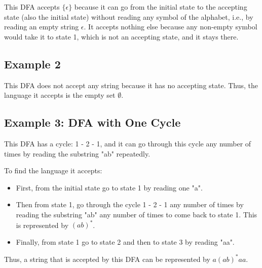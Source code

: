 \documentclass[12pt]{article}
\begin{document}
This DFA accepts \(\{\epsilon\}\) because it can go from the initial state to the accepting state (also the initial state) without reading any symbol of the alphabet, i.e., by reading an empty string \( \epsilon \). It accepts nothing else because any non-empty symbol would take it to state 1, which is not an accepting state, and it stays there.
\newpage
\subsection*{Example 2}
\begin{center}
\end{center}

This DFA does not accept any string because it has no accepting state. Thus, the language it accepts is the empty set \( \emptyset \).
\newpage
\subsection*{Example 3: DFA with One Cycle}
\begin{center}
\end{center}

This DFA has a cycle: 1 - 2 - 1, and it can go through this cycle any number of times by reading the substring "ab" repeatedly.

To find the language it accepts:
\begin{itemize}
    \item First, from the initial state go to state 1 by reading one "a".
    \item Then from state 1, go through the cycle 1 - 2 - 1 any number of times by reading the substring "ab" any number of times to come back to state 1. This is represented by \( (ab)^* \).
    \item Finally, from state 1 go to state 2 and then to state 3 by reading "aa".
\end{itemize}
Thus, a string that is accepted by this DFA can be represented by \( a(ab)^*aa \).
\newpage
\end{document}
